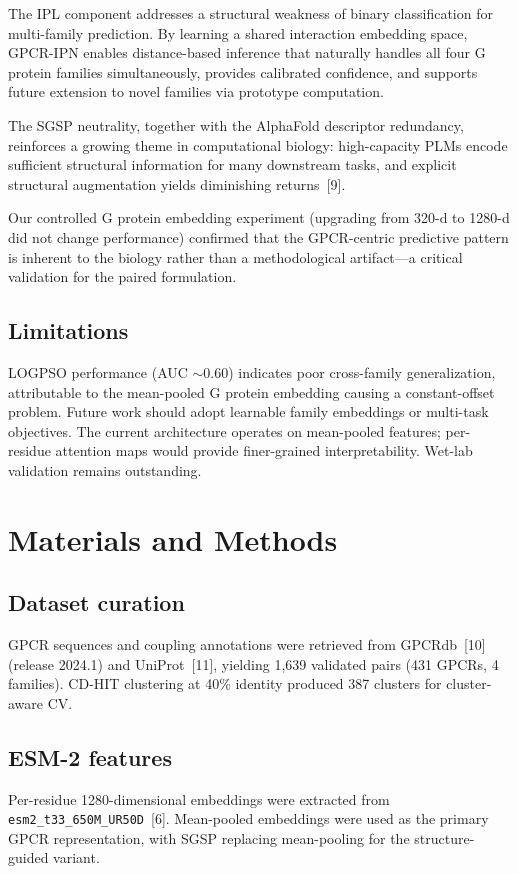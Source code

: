 \documentclass[unnumsec,webpdf,contemporary,large,numbered]{oup-authoring-template}
\begin{document}
The IPL component addresses a structural weakness of binary classification for multi-family prediction. By learning a shared interaction embedding space, GPCR-IPN enables distance-based inference that naturally handles all four G protein families simultaneously, provides calibrated confidence, and supports future extension to novel families via prototype computation.

The SGSP neutrality, together with the AlphaFold descriptor redundancy, reinforces a growing theme in computational biology: high-capacity PLMs encode sufficient structural information for many downstream tasks, and explicit structural augmentation yields diminishing returns~[9].

Our controlled G protein embedding experiment (upgrading from 320-d to 1280-d did not change performance) confirmed that the GPCR-centric predictive pattern is inherent to the biology rather than a methodological artifact---a critical validation for the paired formulation.

\subsection{Limitations}

LOGPSO performance (AUC $\sim$0.60) indicates poor cross-family generalization, attributable to the mean-pooled G protein embedding causing a constant-offset problem. Future work should adopt learnable family embeddings or multi-task objectives. The current architecture operates on mean-pooled features; per-residue attention maps would provide finer-grained interpretability. Wet-lab validation remains outstanding.

\section{Materials and Methods}

\subsection{Dataset curation}
GPCR sequences and coupling annotations were retrieved from GPCRdb~[10] (release 2024.1) and UniProt~[11], yielding 1,639 validated pairs (431 GPCRs, 4 families). CD-HIT clustering at 40\% identity produced 387 clusters for cluster-aware CV.

\subsection{ESM-2 features}
Per-residue 1280-dimensional embeddings were extracted from \texttt{esm2\_t33\_650M\_UR50D}~[6]. Mean-pooled embeddings were used as the primary GPCR representation, with SGSP replacing mean-pooling for the structure-guided variant.
\end{document}
